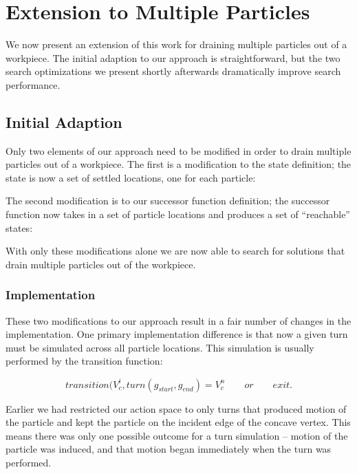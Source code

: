 \chapter{Extension to Multiple Particles}\label{multipleExtension}

We now present an extension of this work for draining multiple particles out of a workpiece. The initial adaption to our approach is straightforward, but the two search optimizations we present shortly afterwards dramatically improve search performance.

\section{Initial Adaption}

Only two elements of our approach need to be modified in order to drain multiple particles out of a workpiece. The first is a modification to the state definition; the state is now a set of settled locations, one for each particle:

 {
  \label{eq:multipleParticleState}
}

The second modification is to our successor function definition; the successor function now takes in a set of particle locations and produces a set of ``reachable'' states:

 {
  \label{eq:successorMultipleParticle}
}

With only these modifications alone we are now able to search for solutions that drain multiple particles out of the workpiece.

\subsection{Implementation}

These two modifications to our approach result in a fair number of changes in the implementation. One primary implementation difference is that now a given turn must be simulated across all particle locations. This simulation is usually performed by the transition function:

$$
transition(V_{c}^{i}, turn(g_{start}, g_{end}) = V_{c}^n \qquad or \qquad exit.
$$

Earlier we had restricted our action space to only turns that produced motion of the particle and kept the particle on the incident edge of the concave vertex. This means there was only one possible outcome for a turn simulation -- motion of the particle was induced, and that motion began immediately when the turn was performed.

